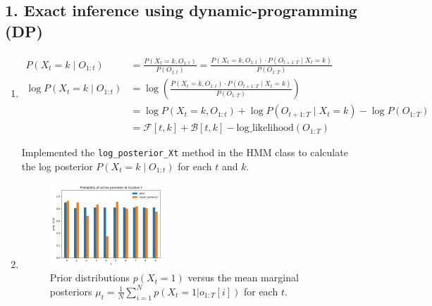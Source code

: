 \documentclass[a4 paper]{article}
\begin{document}
\subsection*{1. Exact inference using dynamic-programming (DP)}

\begin{enumerate}
    \item {}
    
    \begin{align*}
        P(X_t = k \mid O_{1:t}) &= \frac{P(X_t = k, O_{1:t})}{P(O_{1:t})} = \frac{P(X_t = k, O_{1:t}) \cdot P(O_{t+1:T} \mid X_t = k)}{P(O_{1:T})} \\
        \log P(X_t = k \mid O_{1:t}) &= \log \left( \frac{P(X_t = k, O_{1:t}) \cdot P(O_{t+1:T} \mid X_t = k)}{P(O_{1:T})} \right) \\
        &= \log P(X_t = k, O_{1:t}) + \log P(O_{t+1:T} \mid X_t = k) - \log P(O_{1:T}) \\
        &= \mathcal{F}[t, k] + \mathcal{B}[t, k] - \text{log\_likelihood}(O_{1:T})
    \end{align*}

    Implemented the \texttt{log\_posterior\_Xt} method in the HMM class to calculate the log posterior $P(X_t = k \mid O_{1:t})$ for each $t$ and $k$.


    
    \item {}

    \begin{figure}[H]
        \centering
        \includegraphics[width=0.4\textwidth]{../plots/q1_prior_vs_mean_posterior.png}
        \caption{Prior distributions $p(X_t = 1)$ versus the mean marginal posteriors $\mu_t = \frac{1}{N} \sum_{i=1}^{N} p(X_t = 1 | o_{1:T}[i])$ for each $t$.}
    \end{figure}


\end{enumerate}
\end{document}
